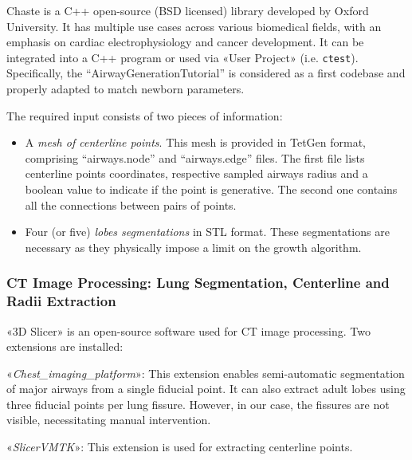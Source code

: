 Chaste is a C++ open-source (BSD licensed) library developed by Oxford
University.  It has multiple use cases across various biomedical
fields, with an emphasis on cardiac electrophysiology and cancer
development\cite{mirams2013}.  It can be integrated into a C++ program
or used via «User Project» (i.e. \texttt{ctest}).  Specifically, the
``AirwayGenerationTutorial'' is considered as a first codebase and
properly adapted to match newborn
parameters\cite{airwaygeneration2024}.

The required input consists of two pieces of information:
\begin{itemize}
\item A \emph{mesh of centerline points}.  This mesh is provided in
  TetGen format, comprising ``airways.node'' and ``airways.edge''
  files. The first file lists centerline points coordinates,
  respective sampled airways radius and a boolean value to indicate if
  the point is generative. The second one contains all the connections
  between pairs of points.
\item Four (or five) \emph{lobes segmentations} in STL format.  These
  segmentations are necessary as they physically impose a limit on the
  growth algorithm.
\end{itemize}

\subsubsection{CT Image Processing: Lung Segmentation, Centerline and
  Radii Extraction}
\label{subsubsec:ct_centerline_radii_extraction}

«3D Slicer» is an open-source software used for CT image processing.
Two extensions are installed:

\begin{description}
\item «\emph{Chest\_imaging\_platform}»: This extension enables
  semi-automatic segmentation of major airways from a single fiducial
  point.  It can also extract adult lobes using three fiducial points
  per lung fissure. However, in our case, the fissures are not
  visible, necessitating manual intervention.
\item «\emph{SlicerVMTK}»: This extension is used for extracting
  centerline points.
\end{description}

